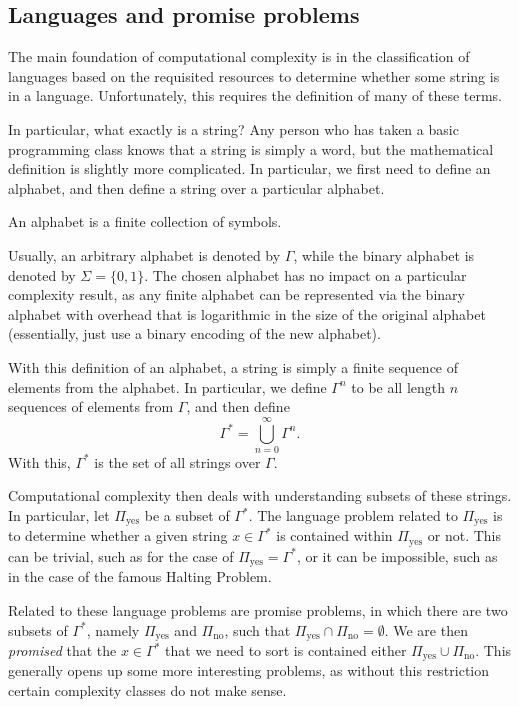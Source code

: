\documentclass[../thesis-main/thesis-main]{subfiles}
\begin{document}
\subsection{Languages and promise problems}

The main foundation of computational complexity is in the classification of languages based on the requisited resources to determine whether some string is in a language.  Unfortunately, this requires the definition of many of these terms.  

In particular, what exactly is a string?  Any person who has taken a basic programming class knows that a string is simply a word, but the mathematical definition is slightly more complicated.  In particular, we first need to define an alphabet, and then define a string over a particular alphabet.  
\begin{definition}[Alphabet] An alphabet is a finite collection of symbols.
\end{definition}
Usually, an arbitrary alphabet is denoted by $\Gamma$, while the binary alphabet is denoted by $\Sigma = \{0,1\}$.  The chosen alphabet has no impact on a particular complexity result, as any finite alphabet can be represented via the binary alphabet with overhead that is logarithmic in the size of the original alphabet (essentially, just use a binary encoding of the new alphabet).  

With this definition of an alphabet, a string is simply a finite sequence of elements from the alphabet.  In particular, we define $\Gamma^n$ to be all length $n$ sequences of elements from $\Gamma$, and then define
\begin{equation}
  \Gamma^* = \bigcup_{n=0}^\infty \Gamma^n.
\end{equation}
With this, $\Gamma^*$ is the set of all strings over $\Gamma$.

Computational complexity then deals with understanding subsets of these strings.  In particular, let $\Pi_{\text{yes}}$ be a subset of $\Gamma^*$.  The language problem related to $\Pi_{\text{yes}}$ is to determine whether a given string $x\in \Gamma^*$ is contained within $\Pi_{\text{yes}}$ or not.  This can be trivial, such as for the case of $\Pi_{\text{yes}} = \Gamma^*$, or it can be impossible, such as in the case of the famous Halting Problem. 

Related to these language problems are promise problems, in which there are two subsets of $\Gamma^*$, namely $\Pi_{\text{yes}}$ and $\Pi_{\text{no}}$, such that $\Pi_{\text{yes}} \cap \Pi_{\text{no}} = \emptyset$.  We are then \emph{promised} that the $x\in \Gamma^*$ that we need to sort is contained either $\Pi_{\text{yes}} \cup \Pi_{\text{no}}$.  This generally opens up some more interesting problems, as without this restriction certain complexity classes do not make sense.
\end{document}
